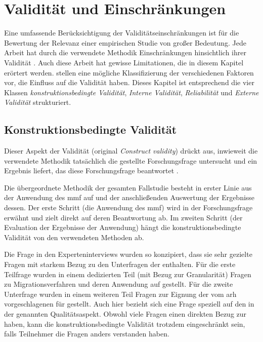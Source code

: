 \chapter{Validität und Einschränkungen}
\label{chap:gueltigkeit}

Eine umfassende Berücksichtigung der Validitätseinschränkungen ist für die Bewertung der Relevanz einer empirischen Studie von großer Bedeutung.
Jede Arbeit hat durch die verwendete Methodik Einschränkungen hinsichtlich ihrer Validität \cite{campbell2015experimental}.
Auch diese Arbeit hat gewisse Limitationen, die in diesem Kapitel erörtert werden.
 stellen eine mögliche Klassifizierung der verschiedenen Faktoren vor, die Einfluss auf die Validität haben.
Dieses Kapitel ist entsprechend die vier Klassen \emph{konstruktionsbedingte Validität}, \emph{Interne Validität}, \emph{Reliabilität} und \emph{Externe Validität} strukturiert.

\section{Konstruktionsbedingte Validität}

Dieser Aspekt der Validität (original \emph{Construct validity}) drückt aus, inwieweit die verwendete Methodik tatsächlich die gestellte Forschungsfrage untersucht und ein Ergebnis liefert, das diese Forschungsfrage beantwortet \cite{Runeson2009}.

Die übergeordnete Methodik der gesamten Fallstudie besteht in erster Linie aus der Anwendung des \gls{mmf} auf \jf und der anschließenden Auswertung der Ergebnisse dessen.
Der erste Schritt (die Anwendung des \gls{mmf}) wird in der Forschungsfrage erwähnt und zielt direkt auf deren Beantwortung ab.
Im zweiten Schritt (der Evaluation der Ergebnisse der Anwendung) hängt die konstruktionsbedingte Validität von den verwendeten Methoden ab.

Die Frage in den Experteninterviews wurden so konzipiert, dass sie sehr gezielte Fragen mit starkem Bezug zu den Unterfragen der \ff enthalten.
Für die erste Teilfrage wurden in einem dedizierten Teil (mit Bezug zur Granularität) Fragen zu Migrationsverfahren und deren Anwendung auf \jf gestellt.
Für die zweite Unterfrage wurden in einem weiteren Teil Fragen zur Eignung der vom \gls{arh} vorgeschlagenen \bpp für \jf gestellt.
Auch hier bezieht sich eine Frage speziell auf den in der \ff genannten Qualitätsaspekt.
Obwohl viele Fragen einen direkten Bezug zur \ff haben, kann die konstruktionsbedingte Validität trotzdem eingeschränkt sein, falls Teilnehmer die Fragen anders verstanden haben.

